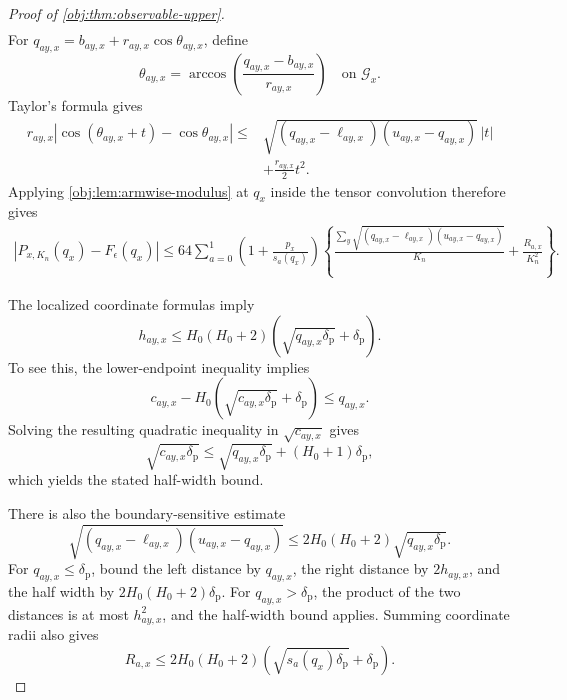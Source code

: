 \begin{proof}[Proof of \cref{obj:thm:observable-upper}]
\[\begin{aligned}
\end{aligned}
\]
For \(q_{ay,x}=b_{ay,x}+r_{ay,x}\cos\theta_{ay,x}\), define
\[
\theta_{ay,x}
=
\arccos\left(\frac{q_{ay,x}-b_{ay,x}}{r_{ay,x}}\right)
\quad\text{on }\mathcal G_x.
\]
Taylor's formula gives
\[
\begin{aligned}
r_{ay,x}
|\cos(\theta_{ay,x}+t)-\cos\theta_{ay,x}|
\le{}&
\sqrt{(q_{ay,x}-\ell_{ay,x})(u_{ay,x}-q_{ay,x})}\,|t|\\
&+\frac{r_{ay,x}}2t^2.
\end{aligned}
\]
Applying \cref{obj:lem:armwise-modulus} at \(q_x\) inside the tensor convolution therefore gives
\[
\begin{aligned}
|P_{x,K_n}(q_x)-F_\epsilon(q_x)|
\le64\sum_{a=0}^1
\left(1+\frac{p_x}{s_a(q_x)}\right)
\left\{
\frac{\sum_y\sqrt{(q_{ay,x}-\ell_{ay,x})(u_{ay,x}-q_{ay,x})}}{K_n}
+\frac{R_{a,x}}{K_n^2}
\right\}.
\end{aligned}
\]

The localized coordinate formulas imply
\[
h_{ay,x}
\le H_0(H_0+2)
\left(\sqrt{q_{ay,x}\delta_{\mathrm p}}+\delta_{\mathrm p}\right).
\]
To see this, the lower-endpoint inequality implies
\[
c_{ay,x}-H_0\left(\sqrt{c_{ay,x}\delta_{\mathrm p}}+\delta_{\mathrm p}\right)
\le q_{ay,x}.
\]
Solving the resulting quadratic inequality in \(\sqrt{c_{ay,x}}\) gives
\[
\sqrt{c_{ay,x}\delta_{\mathrm p}}
\le
\sqrt{q_{ay,x}\delta_{\mathrm p}}+(H_0+1)\delta_{\mathrm p},
\]
which yields the stated half-width bound.

There is also the boundary-sensitive estimate
\[
\sqrt{(q_{ay,x}-\ell_{ay,x})(u_{ay,x}-q_{ay,x})}
\le2H_0(H_0+2)\sqrt{q_{ay,x}\delta_{\mathrm p}}.
\]
For \(q_{ay,x}\le\delta_{\mathrm p}\), bound the left distance by \(q_{ay,x}\), the right distance by \(2h_{ay,x}\), and the half width by
\(2H_0(H_0+2)\delta_{\mathrm p}\). For \(q_{ay,x}>\delta_{\mathrm p}\), the product of the two distances is at most \(h_{ay,x}^2\), and the half-width bound applies. Summing coordinate radii also gives
\[
R_{a,x}
\le2H_0(H_0+2)
\left(\sqrt{s_a(q_x)\delta_{\mathrm p}}+\delta_{\mathrm p}\right).
\]


\end{proof}
